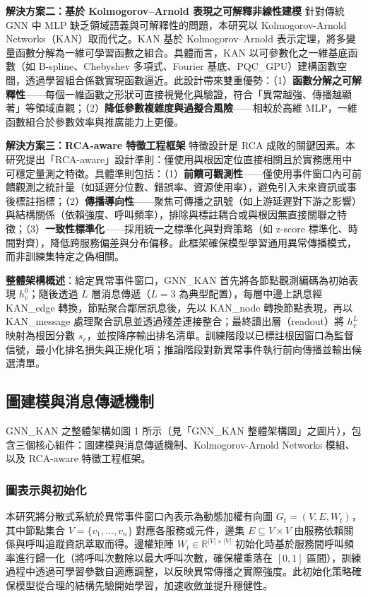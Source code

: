 \documentclass[10pt,a4paper,twocolumn]{article}
\begin{document}
\textbf{解決方案二：基於 Kolmogorov–Arnold 表現之可解釋非線性建模}  
針對傳統 GNN 中 MLP 缺乏領域語義與可解釋性的問題，本研究以 Kolmogorov-Arnold Networks（KAN）取而代之。KAN 基於 Kolmogorov–Arnold 表示定理，將多變量函數分解為一維可學習函數之組合。具體而言，KAN 以可參數化之一維基底函數（如 B-spline、Chebyshev 多項式、Fourier 基底、PQC\_GPU）建構函數空間，透過學習組合係數實現函數逼近。此設計帶來雙重優勢：（1）\textbf{函數分解之可解釋性}——每個一維函數之形狀可直接視覺化與驗證，符合「異常越強、傳播越顯著」等領域直觀；（2）\textbf{降低參數複雜度與過擬合風險}——相較於高維 MLP，一維函數組合於參數效率與推廣能力上更優。

\textbf{解決方案三：RCA-aware 特徵工程框架}  
特徵設計是 RCA 成敗的關鍵因素。本研究提出「RCA-aware」設計準則：僅使用與根因定位直接相關且於實務應用中可穩定量測之特徵。具體準則包括：（1）\textbf{前饋可觀測性}——僅使用事件窗口內可前饋觀測之統計量（如延遲分位數、錯誤率、資源使用率），避免引入未來資訊或事後標註指標；（2）\textbf{傳播導向性}——聚焦可傳播之訊號（如上游延遲對下游之影響）與結構關係（依賴強度、呼叫頻率），排除與標註耦合或與根因無直接關聯之特徵；（3）\textbf{一致性標準化}——採用統一之標準化與對齊策略（如 z-score 標準化、時間對齊），降低跨服務偏差與分布偏移。此框架確保模型學習通用異常傳播模式，而非訓練集特定之偽相關。

\textbf{整體架構概述}：給定異常事件窗口，GNN\_KAN 首先將各節點觀測編碼為初始表現 $h_v^0$；隨後透過 $L$ 層消息傳遞（$L=3$ 為典型配置），每層中邊上訊息經 KAN\_edge 轉換，節點聚合鄰居訊息後，先以 KAN\_node 轉換節點表現，再以 KAN\_message 處理聚合訊息並透過殘差連接整合；最終讀出層（readout）將 $h_v^L$ 映射為根因分數 $s_v$，並按降序輸出排名清單。訓練階段以已標註根因窗口為監督信號，最小化排名損失與正規化項；推論階段對新異常事件執行前向傳播並輸出候選清單。

\subsection{圖建模與消息傳遞機制}

GNN\_KAN 之整體架構如圖 1 所示（見「GNN\_KAN 整體架構圖」之圖片），包含三個核心組件：圖建模與消息傳遞機制、Kolmogorov-Arnold Networks 模組、以及 RCA-aware 特徵工程框架。

\subsubsection{圖表示與初始化}

本研究將分散式系統於異常事件窗口內表示為動態加權有向圖 $G_t = (V, E, W_t)$，其中節點集合 $V = \{v_1, ..., v_n\}$ 對應各服務或元件，邊集 $E \subseteq V \times V$ 由服務依賴關係與呼叫追蹤資訊萃取而得。邊權矩陣 $W_t \in \mathbb{R}^{|V| \times |V|}$ 初始化時基於服務間呼叫頻率進行歸一化（將呼叫次數除以最大呼叫次數，確保權重落在 $[0, 1]$ 區間），訓練過程中透過可學習參數自適應調整，以反映異常傳播之實際強度。此初始化策略確保模型從合理的結構先驗開始學習，加速收斂並提升穩健性。
\end{document}
